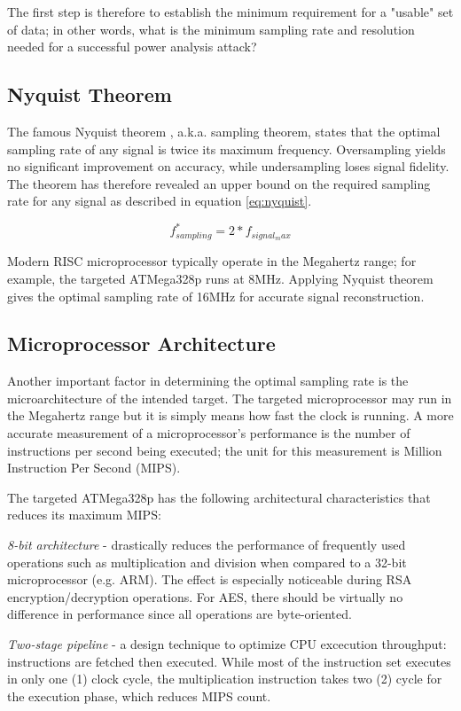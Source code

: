 \documentclass[conference]{IEEEtran}
\begin{document}
The first step is therefore to establish the minimum requirement for a "usable" set of data; in other words, what is the minimum sampling rate and resolution needed for a successful power analysis attack?

\subsection{Nyquist Theorem}
The famous Nyquist theorem \cite{nyquist1928certain}, a.k.a. sampling theorem, states that the optimal sampling rate of any signal is twice its maximum frequency. Oversampling yields no significant improvement on accuracy, while undersampling loses signal fidelity. The theorem has therefore revealed an upper bound on the required sampling rate for any signal as described in equation \ref{eq:nyquist}.

\begin{equation}\label{eq:nyquist}
f^{*}_{sampling} = 2*f_{signal_max}
\end{equation}

Modern RISC microprocessor typically operate in the Megahertz range; for example, the targeted ATMega328p runs at 8MHz. Applying Nyquist theorem gives the optimal sampling rate of 16MHz for accurate signal reconstruction.

\subsection{Microprocessor Architecture}
Another important factor in determining the optimal sampling rate is the microarchitecture of the intended target. The targeted microprocessor may run in the Megahertz range but it is simply means how fast the clock is running. A more accurate measurement of a microprocessor's performance is the number of instructions per second being executed; the unit for this measurement is Million Instruction Per Second (MIPS).

The targeted ATMega328p has the following architectural characteristics that reduces its maximum MIPS:

\textit{8-bit architecture} - drastically reduces the performance of frequently used operations such as multiplication and division when compared to a 32-bit microprocessor (e.g. ARM). The effect is especially noticeable during RSA encryption/decryption operations. For AES, there should be virtually no difference in performance since all operations are byte-oriented.

\textit{Two-stage pipeline} - a design technique to optimize CPU excecution throughput: instructions are fetched then executed. While most of the instruction set executes in only one (1) clock cycle, the multiplication instruction takes two (2) cycle for the execution phase, which reduces MIPS count.
\end{document}
